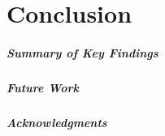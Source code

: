 \chapter{Conclusion}

\paragraph{Summary of Key Findings}

\paragraph{Future Work}

\paragraph{Acknowledgments}